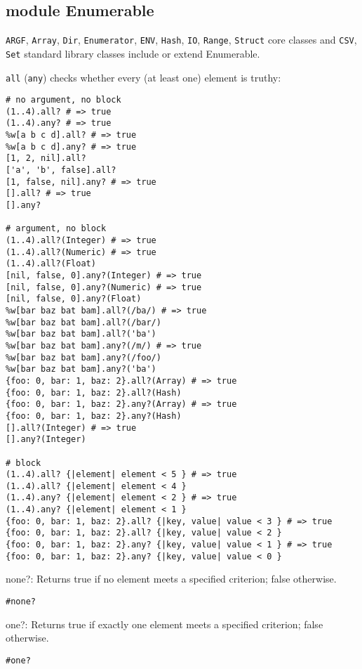 \subsection{module Enumerable}
\texttt{ARGF}, \texttt{Array}, \texttt{Dir}, \texttt{Enumerator}, \texttt{ENV}, \texttt{Hash}, \texttt{IO}, \texttt{Range}, \texttt{Struct} core classes and \texttt{CSV}, \texttt{Set} standard library classes include or extend Enumerable.

\texttt{all} (\texttt{any}) checks whether every (at least one) element is truthy:
\begin{verbatim}
# no argument, no block
(1..4).all? # => true
(1..4).any? # => true
%w[a b c d].all? # => true
%w[a b c d].any? # => true
[1, 2, nil].all?
['a', 'b', false].all?
[1, false, nil].any? # => true
[].all? # => true
[].any?

# argument, no block
(1..4).all?(Integer) # => true
(1..4).all?(Numeric) # => true
(1..4).all?(Float)
[nil, false, 0].any?(Integer) # => true
[nil, false, 0].any?(Numeric) # => true
[nil, false, 0].any?(Float)
%w[bar baz bat bam].all?(/ba/) # => true
%w[bar baz bat bam].all?(/bar/)
%w[bar baz bat bam].all?('ba')
%w[bar baz bat bam].any?(/m/) # => true
%w[bar baz bat bam].any?(/foo/)
%w[bar baz bat bam].any?('ba')
{foo: 0, bar: 1, baz: 2}.all?(Array) # => true
{foo: 0, bar: 1, baz: 2}.all?(Hash)
{foo: 0, bar: 1, baz: 2}.any?(Array) # => true
{foo: 0, bar: 1, baz: 2}.any?(Hash)
[].all?(Integer) # => true
[].any?(Integer)

# block
(1..4).all? {|element| element < 5 } # => true
(1..4).all? {|element| element < 4 }
(1..4).any? {|element| element < 2 } # => true
(1..4).any? {|element| element < 1 }
{foo: 0, bar: 1, baz: 2}.all? {|key, value| value < 3 } # => true
{foo: 0, bar: 1, baz: 2}.all? {|key, value| value < 2 }
{foo: 0, bar: 1, baz: 2}.any? {|key, value| value < 1 } # => true
{foo: 0, bar: 1, baz: 2}.any? {|key, value| value < 0 }
\end{verbatim}

none?: Returns true if no element meets a specified criterion; false otherwise.
\begin{verbatim}
#none?
\end{verbatim}

one?: Returns true if exactly one element meets a specified criterion; false otherwise.
\begin{verbatim}
#one?
\end{verbatim}

